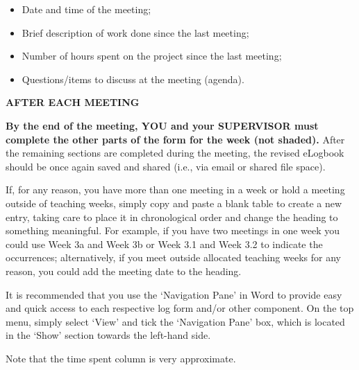 \documentclass[../CHEFCookingHelperForEveryonesFridge.tex]{subfiles}
\begin{document}
\begin{itemize}
    \item Date and time of the meeting;
    \item Brief description of work done since the last meeting;
    \item Number of hours spent on the project since the last meeting;
    \item Questions/items to discuss at the meeting (agenda).
\end{itemize}

\textbf{AFTER EACH MEETING}

\textbf{By the end of the meeting, YOU and your SUPERVISOR must complete the other parts of the form for the week
(not shaded).} After the remaining sections are completed during the meeting, the revised eLogbook should be once
again saved and shared (i.e., via email or shared file space).

If, for any reason, you have more than one meeting in a week or hold a meeting outside of teaching weeks,
simply copy and paste a blank table to create a new entry, taking care to place it in chronological order and
change the heading to something meaningful. For example, if you have two meetings in one week you could use
Week 3a and Week 3b or Week 3.1 and Week 3.2 to indicate the occurrences; alternatively, if you meet outside
allocated teaching weeks for any reason, you could add the meeting date to the heading.

It is recommended that you use the \enquote*{Navigation Pane} in Word to provide easy and quick access to each respective
log form and/or other component.  On the top menu, simply select \enquote*{View} and tick the \enquote*{Navigation Pane} box, which
is located in the \enquote*{Show} section towards the left-hand side.

Note that the time spent column is very approximate.


\end{document}
